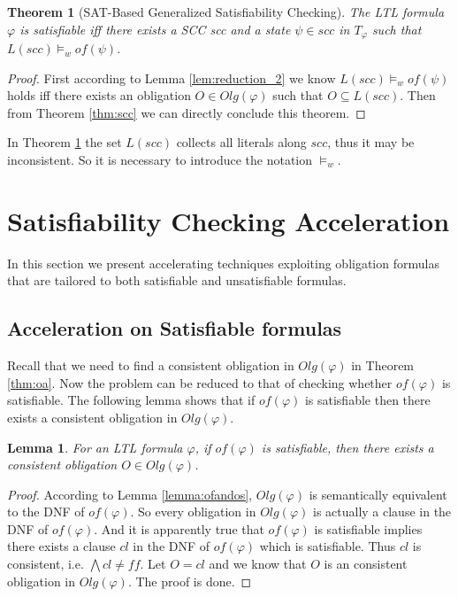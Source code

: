 \documentclass[conference]{IEEEtran}
\newtheorem{lemma}{Lemma}
\newtheorem{theorem}{Theorem}
\newtheorem{proof}{IEEEproof}
\def\olg#1{\mathit{Olg}(#1)}
\def\phi{\varphi}
\def\ff{\mathit{ff}}
\def\of#1{\mathit{of}(#1)}
\begin{document}
\begin{theorem}[SAT-Based Generalized Satisfiability Checking]\label{thm:satscc}
  The LTL formula $\phi$ is satisfiable iff there exists a SCC scc and a state $\psi\in scc$ 
  in $T_\phi$ such that $L(scc)\models_w \of{\psi}$.
\end{theorem}
\begin{proof}
  First according to Lemma \ref{lem:reduction_2} we know $L(scc)\models_w \of{\psi}$ holds iff 
  there exists an obligation $O\in\olg{\phi}$ such that $O\subseteq L(scc)$. Then from  
  Theorem \ref{thm:scc} we can directly conclude this theorem.
\end{proof}

In Theorem \ref{thm:satscc} the set $L(scc)$ collects all literals along $scc$, thus it may 
be inconsistent. So it is necessary to introduce the notation $\models_w$.
  
\section{Satisfiability Checking Acceleration}\label{sec:ofa}

In this section we present accelerating techniques exploiting
obligation formulas that are tailored to both satisfiable and
unsatisfiable formulas.

\subsection{Acceleration on Satisfiable formulas }
Recall that we need to find a consistent obligation in $\olg{\phi}$ in Theorem \ref{thm:oa}. 
Now the problem can be reduced to that of  
checking whether $\of{\phi}$ is satisfiable. The following lemma shows that if $\of{\phi}$ is 
satisfiable then there exists a consistent obligation in $\olg{\phi}$. 

\begin{lemma}\label{lem:reduction}
  For an LTL formula $\phi$, if $\of{\phi}$ is satisfiable, then there exists a consistent 
  obligation $O\in \olg{\phi}$. 
\end{lemma}
\begin{proof}
  According to Lemma \ref{lemma:ofandos}, $\olg{\phi}$ is semantically
  equivalent to the DNF of $\of{\phi}$. So every
  obligation in $\olg{\phi}$ is actually a clause in the DNF of
  $\of{\phi}$. And it is apparently true that $\of{\phi}$ is
  satisfiable implies there exists a clause $cl$ in the DNF of
  $\of{\phi}$ which is satisfiable. Thus $cl$ is consistent,
  i.e. $\bigwedge cl\not=\ff$. Let $O=cl$ and we know that $O$ is an
  consistent obligation in $\olg{\phi}$. The proof is done.
  
\end{proof}
\end{document}
